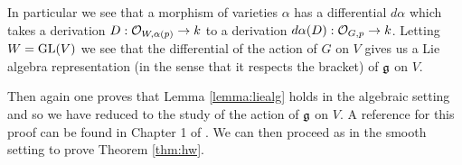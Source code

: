 \documentclass{amsart}
\numberwithin{equation}{section}
\theoremstyle{plain} %
\theoremstyle{definition}
\theoremstyle{remark}
\begin{document}
\hfill

In particular we see that a morphism of varieties $\alpha$ has a differential $d\alpha$ which takes
a derivation $D:{\mathcal{O}}_{W,\alpha(p)}\to k$ to a derivation $d\alpha(D):{\mathcal{O}}_{G,p}\to k$. Letting $W = \operatorname{GL}(V)$
we see that the differential of the action of $G$ on $V$ gives us a Lie algebra representation (in the sense that
it respects the bracket) of $\mathfrak{g}$ on $V$.

\hfill

Then again one proves that Lemma \ref{lemma:liealg} holds in the algebraic setting and
so we have reduced to the study of the action of $\mathfrak{g}$ on $V$. A reference for this
proof can be found in Chapter 1 of \cite{borel}.
We can then proceed as in the smooth setting to prove Theorem \ref{thm:hw}.


{}

\end{document}
